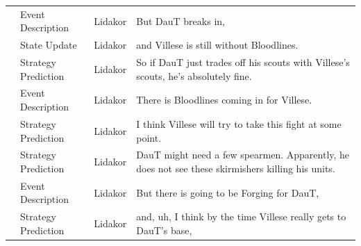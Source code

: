 {\begin{longtable}{@{}>{\theAppRow}r|L{2.3cm}L{1.0cm}U{11.55cm}@{}}
    & Event Description     & Lidakor & But DauT breaks in,                                                                                                                                                                                                                                                                             \\
    & State Update          & Lidakor & and Villese is still without Bloodlines.                                                                                                                                                                                                                                                        \\
    & Strategy Prediction   & Lidakor & So if DauT just trades off his scouts with Villese's scouts, he's absolutely fine.                                                                                                                                                                                                              \\
    & Event Description     & Lidakor & There is Bloodlines coming in for Villese.                                                                                                                                                                                                                                                      \\
    & Strategy Prediction   & Lidakor & I think Villese will try to take this fight at some point.                                                                                                                                                                                                                                      \\
    & Strategy Prediction   & Lidakor & DauT might need a few spearmen. Apparently, he does not see these skirmishers killing his units.                                                                                                                                                                                                \\
    & Event Description     & Lidakor & But there is going to be Forging for DauT,                                                                                                                                                                                                                                                      \\
    & Strategy Prediction   & Lidakor & and, uh, I think by the time Villese really gets to DauT's base,                                                                                                                                                                                                                                \\

\end{longtable}}
